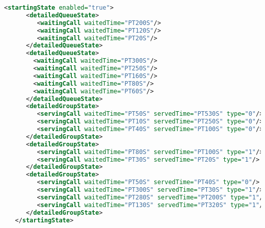 \begin{lstlisting}[caption={Example of a detailed starting state element
of a call center}, language=XML, label=par:sim2skillStartDetailed]
   <startingState enabled="true">
      <detailedQueueState>
         <waitingCall waitedTime="PT200S"/>
         <waitingCall waitedTime="PT120S"/>
         <waitingCall waitedTime="PT20S"/>
      </detailedQueueState>
      <detailedQueueState>
        <waitingCall waitedTime="PT300S"/>
        <waitingCall waitedTime="PT250S"/>
        <waitingCall waitedTime="PT160S"/>
        <waitingCall waitedTime="PT80S"/>
        <waitingCall waitedTime="PT60S"/>
      </detailedQueueState>
      <detailedGroupState>
         <servingCall waitedTime="PT50S" servedTime="PT530S" type="0"/>
         <servingCall waitedTime="PT10S" servedTime="PT250S" type="0"/>
         <servingCall waitedTime="PT40S" servedTime="PT100S" type="0"/>
      </detailedGroupState>
      <detailedGroupState>
         <servingCall waitedTime="PT80S" servedTime="PT100S" type="1"/>
         <servingCall waitedTime="PT30S" servedTime="PT20S" type="1"/> 
      </detailedGroupState>
      <detailedGroupState>
         <servingCall waitedTime="PT50S" servedTime="PT40S" type="0"/>
         <servingCall waitedTime="PT300S" servedTime="PT30S" type="1"/>
         <servingCall waitedTime="PT280S" servedTime="PT200S" type="1"/>
         <servingCall waitedTime="PT130S" servedTime="PT320S" type="1"/>
      </detailedGroupState>
   </startingState>
\end{lstlisting}






